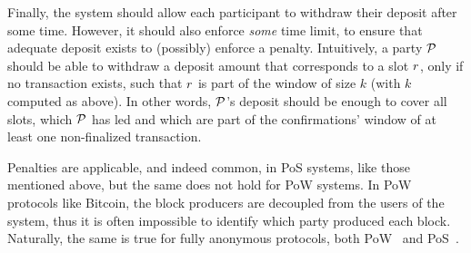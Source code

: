 Finally, the system should allow each participant to withdraw their deposit
after some time. However, it should also enforce \emph{some} time limit, to
ensure that adequate deposit exists to (possibly) enforce a penalty.
Intuitively, a party $\mathcal{P}$ should be able to withdraw a deposit amount that
corresponds to a slot $r$, only if no transaction exists, such that $r$
is part of the window of size $k$ (with $k$ computed as above). In other words,
$\mathcal{P}$'s deposit should be enough to cover all slots, which $\mathcal{P}$ has led
and which are part of the confirmations' window of at least one non-finalized
transaction.

\begin{remark*}
Penalties are applicable, and indeed common, in PoS systems,
like those mentioned above, but the same does not hold for PoW systems. In PoW
protocols like Bitcoin, the block producers are decoupled from the users of the
system, thus it is often impossible to identify which party produced each
block. Naturally, the same is true for fully anonymous protocols, both
PoW~\cite{SP:MGGR13,SP:BCGGMT14} and PoS~\cite{EC:GanOrlTsc19,SP:KKKZ19}.
\end{remark*}
